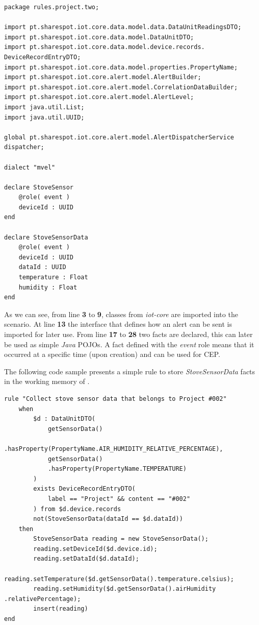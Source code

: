 \begin{lstlisting}[style=drools, caption=Rule Scenario Example - Part 1, label={code:implementation:description:rule:sample1}]
package rules.project.two;

import pt.sharespot.iot.core.data.model.data.DataUnitReadingsDTO;
import pt.sharespot.iot.core.data.model.DataUnitDTO;
import pt.sharespot.iot.core.data.model.device.records. DeviceRecordEntryDTO;
import pt.sharespot.iot.core.data.model.properties.PropertyName;
import pt.sharespot.iot.core.alert.model.AlertBuilder;
import pt.sharespot.iot.core.alert.model.CorrelationDataBuilder;
import pt.sharespot.iot.core.alert.model.AlertLevel;
import java.util.List;
import java.util.UUID;

global pt.sharespot.iot.core.alert.model.AlertDispatcherService dispatcher;

dialect "mvel"

declare StoveSensor
    @role( event )
    deviceId : UUID
end

declare StoveSensorData
    @role( event )
    deviceId : UUID
    dataId : UUID
    temperature : Float
    humidity : Float
end
\end{lstlisting}

As we can see, from line \textbf{3} to \textbf{9}, classes from \textit{iot-core} are imported into the scenario.
At line \textbf{13} the interface that defines how an alert can be sent is imported for later use.
From line \textbf{17} to \textbf{28} two facts are declared, this can later be used as simple \textit{Java} POJOs. A fact defined with the \textit{event} role means that it occurred at a specific time (upon creation) and can be used for \gls{CEP}. 

The following code sample presents a simple rule to store \textit{StoveSensorData} facts in the working memory of . 

\begin{lstlisting}[style=drools, caption=Rule Scenario Example - Part 2, label={code:implementation:description:rule:sample2}] 
rule "Collect stove sensor data that belongs to Project #002"
    when
        $d : DataUnitDTO(
            getSensorData()
            .hasProperty(PropertyName.AIR_HUMIDITY_RELATIVE_PERCENTAGE),
            getSensorData()
            .hasProperty(PropertyName.TEMPERATURE)
        )
        exists DeviceRecordEntryDTO(
            label == "Project" && content == "#002"
        ) from $d.device.records
        not(StoveSensorData(dataId == $d.dataId))
    then
        StoveSensorData reading = new StoveSensorData();
        reading.setDeviceId($d.device.id);
        reading.setDataId($d.dataId);
        reading.setTemperature($d.getSensorData().temperature.celsius);
        reading.setHumidity($d.getSensorData().airHumidity .relativePercentage);
        insert(reading)
end
\end{lstlisting}

